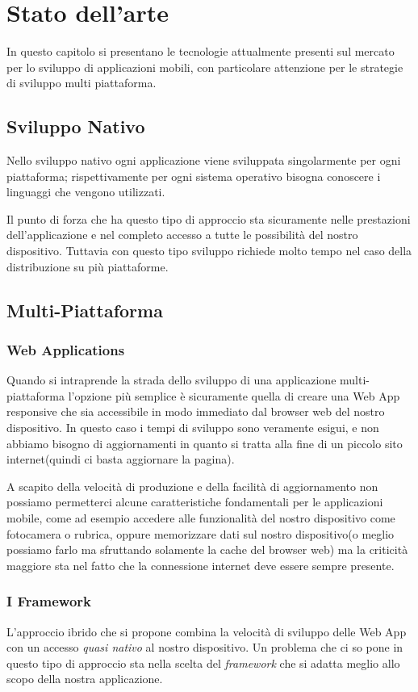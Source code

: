 \chapter{Stato dell'arte} 
In questo capitolo si presentano le tecnologie attualmente presenti sul mercato per lo sviluppo di applicazioni mobili, con particolare attenzione per le strategie di sviluppo multi piattaforma.
\section{Sviluppo Nativo}
Nello sviluppo nativo ogni applicazione viene sviluppata singolarmente per ogni piattaforma; rispettivamente per ogni sistema operativo bisogna conoscere i linguaggi che vengono utilizzati.


Il punto di forza che ha questo tipo di approccio sta sicuramente nelle prestazioni dell'applicazione e nel completo accesso a tutte le possibilità del nostro dispositivo. Tuttavia con questo tipo sviluppo richiede molto tempo nel caso della distribuzione su più piattaforme.
\section{Multi-Piattaforma}

\subsection{Web Applications}
Quando si intraprende la strada dello sviluppo di una applicazione multi-piattaforma l'opzione più semplice è sicuramente quella di creare una Web App responsive che sia accessibile in modo immediato dal browser web del nostro dispositivo. In questo caso i tempi di sviluppo sono veramente esigui, e non abbiamo bisogno di aggiornamenti in quanto si tratta alla fine di un piccolo sito internet(quindi ci basta aggiornare la pagina).

A scapito della velocità di produzione e della facilità di aggiornamento non possiamo permetterci alcune caratteristiche fondamentali per le applicazioni mobile, come ad esempio accedere alle funzionalità del nostro dispositivo come fotocamera o rubrica, oppure memorizzare dati sul nostro dispositivo(o meglio possiamo farlo ma sfruttando solamente la cache del browser web) ma la criticità maggiore sta nel fatto che la connessione internet deve essere sempre presente.

\subsection{I Framework}
L'approccio ibrido che si propone combina la velocità di sviluppo delle Web App con un accesso \emph{quasi nativo} al nostro dispositivo. Un problema che ci so pone in questo tipo di approccio sta nella scelta del \emph{framework} che si adatta  meglio allo scopo della nostra applicazione.

